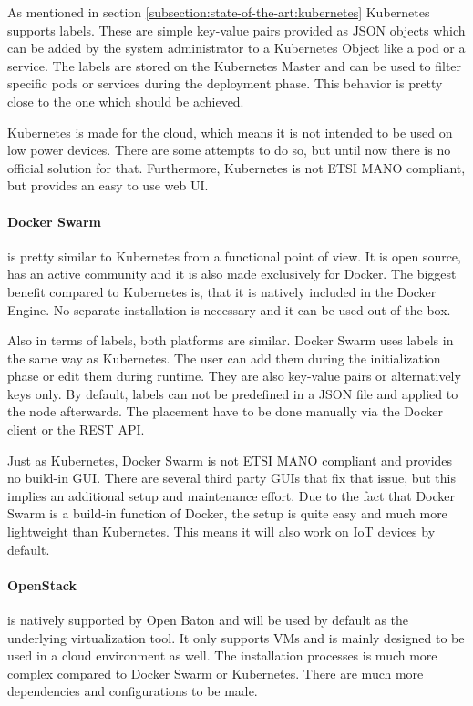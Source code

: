 As mentioned in section \ref{subsection:state-of-the-art:kubernetes} Kubernetes supports labels.
These are simple key-value pairs provided as \ac{JSON} objects which can be added by the system administrator to a Kubernetes Object like a pod or a service.
The labels are stored on the Kubernetes Master and can be used to filter specific pods or services during the deployment phase.
This behavior is pretty close to the one which should be achieved.

Kubernetes is made for the cloud, which means it is not intended to be used on low power devices.
There are some attempts\autocite{kubernetes-installer-rpi}\autocite{kubernetes-on-arm}\autocite{hypriot:kubernetes-on-rpi} to do so, but until now there is no official solution for that.
Furthermore, Kubernetes is not \ac{ETSI} \ac{MANO} compliant, but provides an easy to use web \ac{UI}.

\paragraph{Docker Swarm} is pretty similar to Kubernetes from a functional point of view.
It is open source, has an active community and it is also made exclusively for Docker.
The biggest benefit compared to Kubernetes is, that it is natively included in the Docker Engine.
No separate installation is necessary and it can be used out of the box.

Also in terms of labels, both platforms are similar.
Docker Swarm uses labels in the same way as Kubernetes.
The user can add them during the initialization phase or edit them during runtime.
They are also key-value pairs or alternatively keys only.
By default, labels can not be predefined in a \ac{JSON} file and applied to the node afterwards.
The placement have to be done manually via the Docker client or the \ac{REST} \ac{API}.

Just as Kubernetes, Docker Swarm is not \ac{ETSI} \ac{MANO} compliant and provides no build-in \ac{GUI}.
There are several third party \acp{GUI} that fix that issue, but this implies an additional setup and maintenance effort.
Due to the fact that Docker Swarm is a build-in function of Docker, the setup is quite easy and much more lightweight than Kubernetes.
This means it will also work on \ac{IoT} devices by default.

\paragraph{OpenStack} is natively supported by Open Baton and will be used by default as the underlying virtualization tool.
It only supports \acp{VM} and is mainly designed to be used in a cloud environment as well.
The installation processes is much more complex compared to Docker Swarm or Kubernetes.
There are much more dependencies and configurations to be made.

